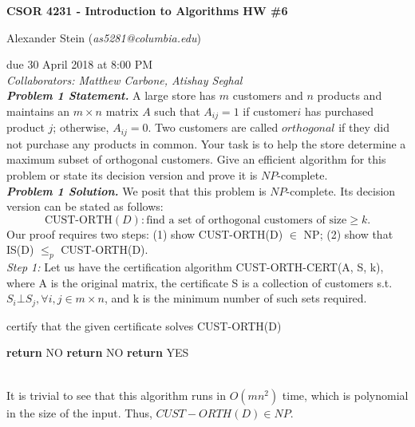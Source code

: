 \documentclass[10pt, letterpaper, twosided]{article}
\begin{document}
\thispagestyle{empty}

\noindent \textbf{CSOR 4231 - Introduction to Algorithms HW \#6}

\noindent Alexander Stein (\emph{as5281@columbia.edu})

\noindent due 30 April 2018 at 8:00 PM\\

\noindent \emph{Collaborators: Matthew Carbone, Atishay Seghal}\\

\emph{\textbf{Problem 1 Statement.}} A large store has $m$ customers and
$n$ products and maintains an $m \times n$ matrix $A$ such that
$A_{ij} = 1$ if customer$i$ has purchased product $j$; otherwise,  $A_{ij} = 0$.
Two customers are called $orthogonal$ if they did not purchase any products in common.
Your task is to help the store determine a maximum subset of orthogonal customers.
Give an efficient algorithm for this problem or state its decision version and prove it is $NP$-complete.\\

\emph{\textbf{Problem 1 Solution.}} We posit that this problem is $NP$-complete.  Its decision version 
can be stated as follows:
$$ \text{CUST-ORTH}(D) : \text{find a set of orthogonal customers of size} \geq k.$$
Our proof requires two steps: (1) show CUST-ORTH(D) $\in$ NP; (2) show that
 IS(D) $\leq_{p}$ CUST-ORTH(D).\\
 
\textit{Step 1:}
Let us have the certification algorithm CUST-ORTH-CERT(A, S, k), where A 
is the original matrix, the certificate S is a collection of customers s.t. 
$S_{i} \bot S_{j}, \forall i,j \in m \times n$, and k is the minimum number of such sets required.
\begin{algorithm}
\caption{certify that the given certificate solves CUST-ORTH(D)}\label{ram}
\begin{algorithmic}[1]
      \State \textbf{return} NO
   \EndIf
            \State \textbf{return} NO
         \EndIf
      \EndFor
   \EndFor
   \State \textbf{return} YES
\EndProcedure
\end{algorithmic}
\end{algorithm}\\
It is trivial to see that this algorithm runs in $O(mn^2)$ time, which is polynomial in the size of the input. 
Thus, $CUST-ORTH(D) \in NP$.\\
\end{document}
